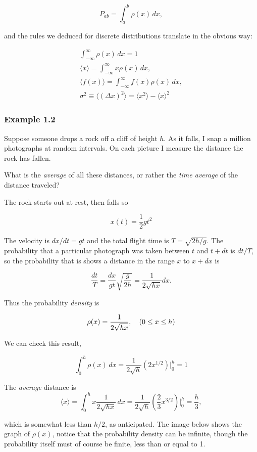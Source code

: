 \documentclass[svgnames]{article}   	%
\begin{document}
\vspace{5px} \[
  P_{ab} = \int_{a}^{b} \rho(x) \, dx,  
\] \vspace{5px}

and the rules we deduced for discrete distributions translate in the obvious
way: 

\begin{align*}
  \int_{-\infty}^{\infty} \rho(x) \, dx = 1 \\
  \langle x \rangle = \int_{-\infty}^{\infty}  x\rho(x)\,dx, \\
  \langle f(x) \rangle = \int_{-\infty}^{\infty}  f(x) \rho(x) \, dx, \\
  \sigma^2 \equiv \langle ( \Delta x)^2 \rangle = \langle x^2 \rangle - \langle
  x \rangle ^2
\end{align*}


\subsubsection{Example 1.2}

Suppose someone drops a rock off a cliff of height $h$. As it falls, I snap
a million photographs at random intervals. On each picture I measure the
distance the rock has fallen. \\

\begin{tcolorbox}[colback = blue!5!white, colframe = blue!50!black, title
= Question]
What is the \textit{average} of all these distances, or rather the \textit{time
average} of the distance traveled? 
\end{tcolorbox} 

\begin{tcolorbox}[colback = red!5!white, colframe = red!50!black, title
= Solution]
The rock starts out at rest, then falls so 

\[
x(t) = \frac{1}{2}gt^2
\]

The velocity is $dx/dt= gt$ and the total flight time is $T = \sqrt{2h/g}$. The
probability that a particular photograph was taken between $t$ and $t + dt$ is
$dt / T$, so the probability that is shows a distance in the range $x$ to $x
+ dx$ is 

\[
  \frac{dt}{T} = \frac{dx}{gt}\sqrt{\frac{g}{2h}} = \frac{1}{2\sqrt{hx}}dx. 
\]

Thus the probability \textit{density} is 

\[
  \rho(x) = \frac{1}{2\sqrt{hx}}, \hspace{10px} (0 \leq x \leq h)
\]

We can check this result, 

\[
  \int_{0}^{h} \rho(x)\,dx = \frac{1}{2\sqrt{h}}(2x^{1/2}) \Big|_0^h = 1 
\]

The \textit{average} distance is 
\[
  \langle x \rangle = \int_{0}^{h} x\frac{1}{2\sqrt{hx}} \,dx
  = \frac{1}{2\sqrt{h}} (\frac{2}{3}x^{3/2})\Big|_0^h = \frac{h}{3}, 
\]

which is somewhat less than $h/2$, as anticipated. The image below shows the
graph of $\rho(x)$, notice that the probability density can be infinite, though
the probability itself must of course be finite, less than or equal to 1. 


\end{tcolorbox} 
\end{document}

